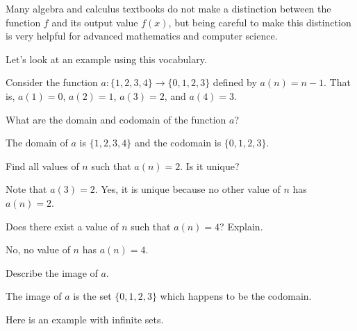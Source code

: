 
Many algebra and calculus textbooks do not make a distinction between the function $f$ and its output value $f(x)$, but being careful to make this distinction is very helpful for advanced mathematics and computer science.  

Let's look at an example using this vocabulary.

\begin{exam}
\label{exam_fn_on1234}
    Consider the function $a: \{1,2,3,4\} \to \{0,1,2,3\}$ defined by $a(n) = n-1$.  That is, $a(1) = 0$, $a(2)=1$, $a(3) = 2$, and $a(4) = 3$.
       \begin{apart}
            \item What are the domain and codomain of the function $a$?
                \begin{soln}
                    The domain of $a$ is $ \{1,2,3,4\}$ and the codomain is $\{0,1,2,3\}$.
                \end{soln}
            \item Find all values of $n$ such that $a(n) = 2$. Is it unique?
                \begin{soln}
                    Note that $a(3)=2$.  Yes, it is unique because no other value of $n$ has $a(n) = 2$.
                \end{soln}            
            \item Does there exist a value of $n$ such that $a(n)=4$?  Explain.
                \begin{soln}
                    No, no value of $n$ has $a(n) = 4$. 
                \end{soln}
            \item Describe the image of $a$.
                \begin{soln}
                    The image of $a$ is the set $\{0,1,2,3\}$ which happens to be the codomain.
                \end{soln}
        \end{apart}    
\end{exam}

Here is an example with infinite sets.


